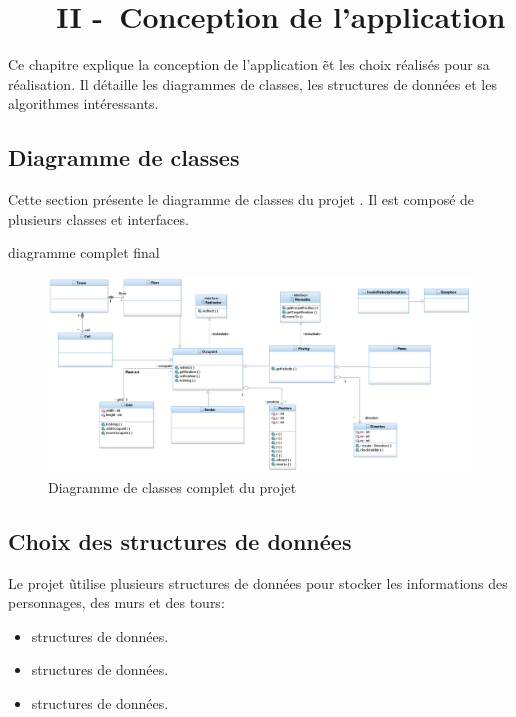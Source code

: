 \chapter[~~~CONCEPTION]{~~~II -~Conception de l’application}%
\label{refDev2}%

Ce chapitre explique la conception de l'application \nom\~et les choix réalisés pour sa réalisation. Il détaille les diagrammes de classes, les structures de données et les algorithmes intéressants.

\section{Diagramme de classes}

Cette section présente le diagramme de classes du projet \nom. Il est composé de plusieurs classes et interfaces.
\bigskip

\textcolor{cardinal}{diagramme complet final}

\begin{figure}[!ht]
  \centering%
  \includegraphics[width=15.5cm]{assets/pictures/ToursInfernales_Main.png} 
  \caption{Diagramme de classes complet du projet}%
\end{figure}
\newpage

\section{Choix des structures de données}

Le projet \nom\~utilise plusieurs structures de données pour stocker les informations des personnages, des murs et des tours:

\begin{itemize}
    \item \textcolor{cardinal}{structures de données}.
    \item \textcolor{cardinal}{structures de données}.
    \item \textcolor{cardinal}{structures de données}.
\end{itemize}


